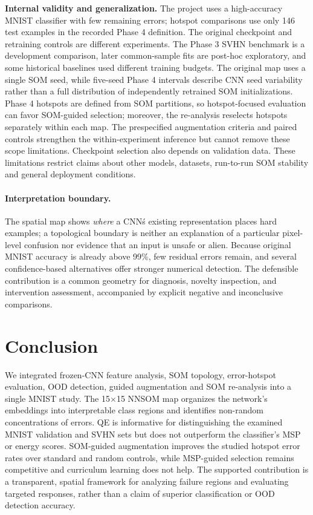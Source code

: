 \documentclass[11pt]{article}
\begin{document}
\textbf{Internal validity and generalization.} The project uses a high-accuracy MNIST classifier with few remaining errors; hotspot comparisons use only 146 test examples in the recorded Phase 4 definition. The original checkpoint and retraining controls are different experiments. The Phase 3 SVHN benchmark is a development comparison, later common-sample fits are post-hoc exploratory, and some historical baselines used different training budgets. The original map uses a single SOM seed, while five-seed Phase 4 intervals describe CNN seed variability rather than a full distribution of independently retrained SOM initializations. Phase 4 hotspots are defined from SOM partitions, so hotspot-focused evaluation can favor SOM-guided selection; moreover, the re-analysis reselects hotspots separately within each map. The prespecified augmentation criteria and paired controls strengthen the within-experiment inference but cannot remove these scope limitations. Checkpoint selection also depends on validation data. These limitations restrict claims about other models, datasets, run-to-run SOM stability and general deployment conditions.

\paragraph{Interpretation boundary.} The spatial map shows \emph{where} a CNN\'s existing representation places hard examples; a topological boundary is neither an explanation of a particular pixel-level confusion nor evidence that an input is unsafe or alien. Because original MNIST accuracy is already above 99\%, few residual errors remain, and several confidence-based alternatives offer stronger numerical detection. The defensible contribution is a common geometry for diagnosis, novelty inspection, and intervention assessment, accompanied by explicit negative and inconclusive comparisons.

\section{Conclusion}\label{sec:conclusion}
We integrated frozen-CNN feature analysis, SOM topology, error-hotspot evaluation, OOD detection, guided augmentation and SOM re-analysis into a single MNIST study. The 15$\times$15 NNSOM map organizes the network's embeddings into interpretable class regions and identifies non-random concentrations of errors. QE is informative for distinguishing the examined MNIST validation and SVHN sets but does not outperform the classifier's MSP or energy scores. SOM-guided augmentation improves the studied hotspot error rates over standard and random controls, while MSP-guided selection remains competitive and curriculum learning does not help. The supported contribution is a transparent, spatial framework for analyzing failure regions and evaluating targeted responses, rather than a claim of superior classification or OOD detection accuracy.
\end{document}
